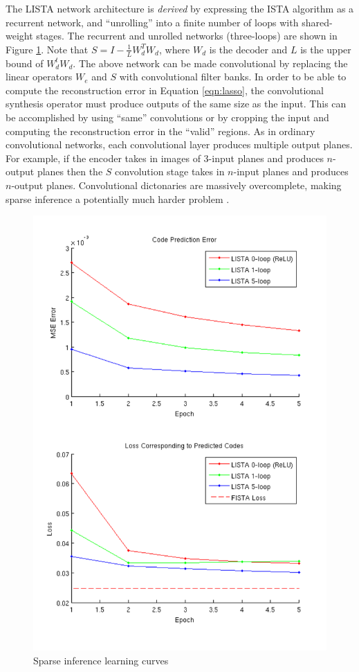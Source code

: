 The LISTA network architecture is \emph{derived} by expressing the ISTA
algorithm as a recurrent network, and ``unrolling'' into a finite number of
loops with shared-weight stages.  The recurrent and unrolled networks
(three-loops) are shown in Figure \ref{fig:LISTA}. Note that
$S=I-\frac{1}{L}W_d^T W_d$, where $W_d$ is the decoder and $L$ is the upper
bound of $W_d^t W_d$.  The above network can be made convolutional by replacing
the linear operators $W_e$ and $S$ with convolutional filter banks. In order to
be able to compute the reconstruction error in Equation \ref{eqn:lasso}, the
convolutional synthesis operator must produce outputs of the same size as the
input. This can be accomplished by using ``same'' convolutions or by cropping
the input and computing the reconstruction error in the ``valid'' regions. As
in ordinary convolutional networks, each convolutional layer produces multiple
output planes. For example, if the encoder takes in images of 3-input planes
and produces $n$-output planes then the $S$ convolution stage takes in
$n$-input planes and produces $n$-output planes. Convolutional dictonaries are
massively overcomplete, making sparse inference a potentially much
harder problem \cite{ConvSC}. 
     
\begin{figure}
\centering
\includegraphics[scale=0.75]{./figures/LISTA/code_pred.pdf}
\caption{Sparse inference learning curves} 
\label{fig:LISTA} 
\end{figure}  


